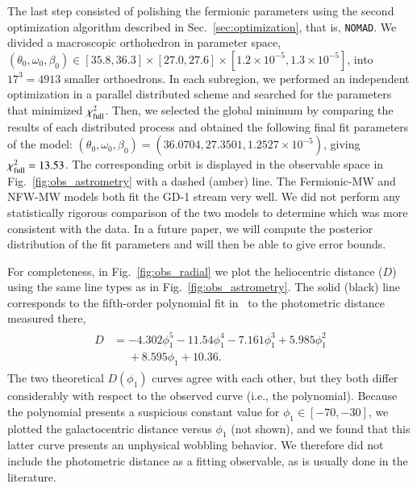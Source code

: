 \documentclass[referee]{aa} %
\begin{document}
The last step consisted of polishing the fermionic parameters using the second optimization algorithm described in Sec.~\ref{sec:optimization}, that is, \texttt{NOMAD}. We divided a  macroscopic orthohedron in parameter space, $(\theta_0, \omega_0, \beta_0) \in [35.8, 36.3]\times[27.0, 27.6]\times [1.2\times10^{-5}, 1.3\times10^{-5}]$, into $17^3=4913$ smaller orthoedrons. In each subregion, we performed an independent optimization in a parallel distributed scheme and searched for the parameters that minimized $\chi^2_{\rm{full}}$. Then, we selected the global minimum by comparing the results of each distributed process and obtained the following final fit parameters of the model: $(\theta_0, \omega_0, \beta_0)= (36.0704, 27.3501, 1.2527\times10^{-5})$, giving $\chi^2_{\rm{full}}= 13.53$.
The corresponding orbit is displayed in the observable space in
Fig.~\ref{fig:obs_astrometry} with a dashed (amber) line. The Fermionic-MW and NFW-MW models both fit the GD-1 stream very well.
We did not perform any statistically rigorous comparison of the two models to determine which was more consistent with the data. In a future paper, we will compute the posterior distribution of the fit parameters and will then be able to give error bounds.


For completeness, in Fig.~\ref{fig:obs_radial} we plot the heliocentric distance ($D$) using the same line types as in Fig.~\ref{fig:obs_astrometry}. The solid (black) line corresponds to the fifth-order polynomial fit in~\cite{Ibata_2020} to the photometric distance measured there,
\begin{align}
 \label{phot_dist}
    \begin{split}
        D &= -4.302\phi_1^5 - 11.54\phi_1^4 - 7.161\phi_1^3 + 5.985\phi_1^2\\
      &\phantom{=} + 8.595\phi_1+10.36.
    \end{split}
\end{align}
The two theoretical $D(\phi_1)$ curves agree with each other, but they both differ considerably with respect to the observed curve (i.e., the polynomial). Because the polynomial presents a suspicious constant value for $\phi_1 \in [-70,-30]$, we plotted the galactocentric distance versus $\phi_1$ (not shown), and we found that this latter curve presents an unphysical wobbling behavior. We therefore did not include the photometric distance as a fitting observable, as is usually done in the literature.
\end{document}
